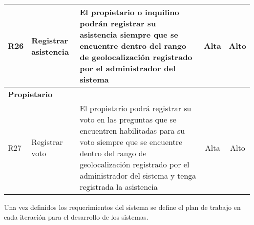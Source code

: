 \begin{spacing}{1}
\begin{center}
\begin{longtable}[l]{|p{}|p{}|p{}|p{}| p{}|}
            \hline
            R26         & Registrar asistencia                              & El propietario o inquilino podrán registrar su asistencia siempre que se encuentre dentro del rango de geolocalización registrado por el administrador del sistema & \multicolumn{1}{c|}{Alta} & \multicolumn{1}{c|}{Alto}\\
            \hline
            \multicolumn{5}{|l|}{ \textbf{Propietario} } \\
            \hline
            R27         & Registrar voto                                    & El propietario podrá registrar su voto en las preguntas que se encuentren habilitadas para su voto siempre que se encuentre dentro del rango de geolocalización registrado por el administrador del sistema y tenga registrada la asistencia& \multicolumn{1}{c|}{Alta} & \multicolumn{1}{c|}{Alto}\\
            \hline
        \end{longtable}\label{tab:table_requerimientos}
    \end{center}
\end{spacing}

Una vez definidos los requerimientos del sistema se define el plan de trabajo en cada iteración para el desarrollo de los sistemas.

